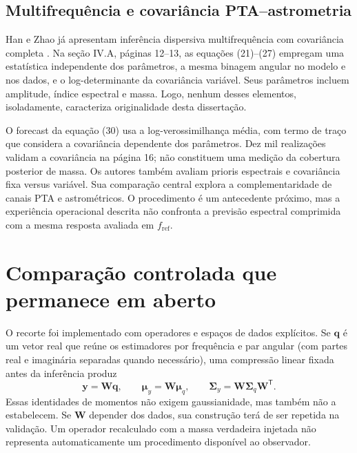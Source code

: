 \subsection{Multifrequência e covariância PTA--astrometria}

Han e Zhao já apresentam inferência dispersiva multifrequência com
covariância completa \autocite{han2026}. Na seção IV.A, páginas 12--13,
as equações (21)--(27) empregam uma estatística independente dos
parâmetros, a mesma binagem angular no modelo e nos dados, e o
log-determinante da covariância variável. Seus parâmetros incluem
amplitude, índice espectral e massa. Logo, nenhum desses elementos,
isoladamente, caracteriza originalidade desta dissertação.

O forecast da equação (30) usa a log-verossimilhança média, com termo
de traço que considera a covariância dependente dos parâmetros. Dez
mil realizações validam a covariância na página 16; não constituem uma
medição da cobertura posterior de massa. Os autores também avaliam
prioris espectrais e covariância fixa versus variável. Sua comparação
central explora a complementaridade de canais PTA e astrométricos.
O procedimento é um antecedente próximo, mas a experiência operacional
descrita não confronta a previsão espectral comprimida com a mesma
resposta avaliada em \(f_{\mathrm{ref}}\).

\section{Comparação controlada que permanece em aberto}

O recorte foi implementado com operadores e espaços de dados explícitos.
Se \(\mathbf q\) é um vetor real que reúne os estimadores por frequência
e par angular (com partes real e imaginária separadas quando necessário),
uma compressão linear fixada antes da inferência produz
\begin{equation}
 \mathbf y=\mathbf W\mathbf q,\qquad
 \boldsymbol\mu_y=\mathbf W\boldsymbol\mu_q,\qquad
 \boldsymbol\Sigma_y=\mathbf W\boldsymbol\Sigma_q\mathbf W^\mathsf T.
 \label{eq:rev-compressao-operador}
\end{equation}
Essas identidades de momentos não exigem gaussianidade, mas também não
a estabelecem. Se \(\mathbf W\) depender dos dados, sua construção
terá de ser repetida na validação. Um operador recalculado com a massa
verdadeira injetada não representa automaticamente um procedimento
disponível ao observador.

